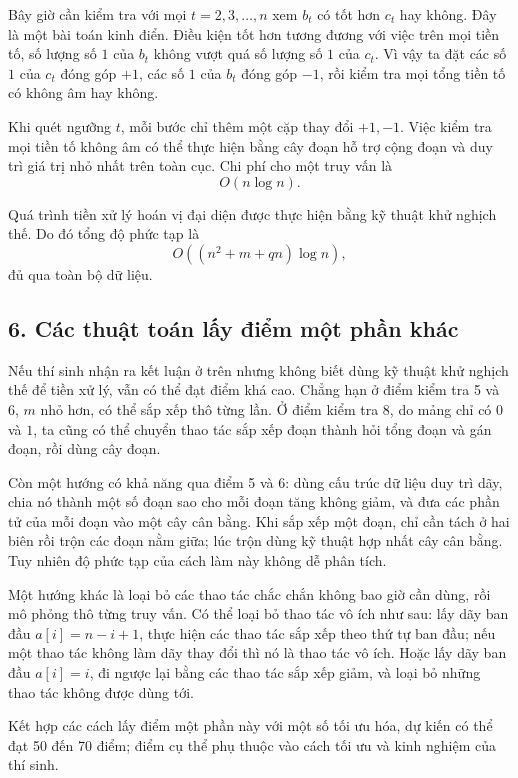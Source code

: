 \documentclass[11pt]{article}
\begin{document}
Bây giờ cần kiểm tra với mọi \(t=2,3,\ldots,n\) xem \(b_t\) có tốt hơn
\(c_t\) hay không. Đây là một bài toán kinh điển. Điều kiện tốt hơn tương
đương với việc trên mọi tiền tố, số lượng số \(1\) của \(b_t\) không vượt quá
số lượng số \(1\) của \(c_t\). Vì vậy ta đặt các số \(1\) của \(c_t\) đóng
góp \(+1\), các số \(1\) của \(b_t\) đóng góp \(-1\), rồi kiểm tra mọi tổng
tiền tố có không âm hay không.

Khi quét ngưỡng \(t\), mỗi bước chỉ thêm một cặp thay đổi \(+1,-1\). Việc kiểm
tra mọi tiền tố không âm có thể thực hiện bằng cây đoạn hỗ trợ cộng đoạn và
duy trì giá trị nhỏ nhất trên toàn cục. Chi phí cho một truy vấn là
\[
  O(n\log n).
\]

Quá trình tiền xử lý hoán vị đại diện được thực hiện bằng kỹ thuật khử nghịch
thế. Do đó tổng độ phức tạp là
\[
  O((n^2+m+qn)\log n),
\]
đủ qua toàn bộ dữ liệu.

\subsection*{6. Các thuật toán lấy điểm một phần khác}

Nếu thí sinh nhận ra kết luận ở trên nhưng không biết dùng kỹ thuật khử
nghịch thế để tiền xử lý, vẫn có thể đạt điểm khá cao. Chẳng hạn ở điểm kiểm
tra 5 và 6, \(m\) nhỏ hơn, có thể sắp xếp thô từng lần. Ở điểm kiểm tra 8,
do mảng chỉ có \(0\) và \(1\), ta cũng có thể chuyển thao tác sắp xếp đoạn
thành hỏi tổng đoạn và gán đoạn, rồi dùng cây đoạn.

Còn một hướng có khả năng qua điểm 5 và 6: dùng cấu trúc dữ liệu duy trì dãy,
chia nó thành một số đoạn sao cho mỗi đoạn tăng không giảm, và đưa các phần
tử của mỗi đoạn vào một cây cân bằng. Khi sắp xếp một đoạn, chỉ cần tách ở
hai biên rồi trộn các đoạn nằm giữa; lúc trộn dùng kỹ thuật hợp nhất cây cân
bằng. Tuy nhiên độ phức tạp của cách làm này không dễ phân tích.

Một hướng khác là loại bỏ các thao tác chắc chắn không bao giờ cần dùng, rồi
mô phỏng thô từng truy vấn. Có thể loại bỏ thao tác vô ích như sau: lấy dãy
ban đầu \(a[i]=n-i+1\), thực hiện các thao tác sắp xếp theo thứ tự ban đầu;
nếu một thao tác không làm dãy thay đổi thì nó là thao tác vô ích. Hoặc lấy
dãy ban đầu \(a[i]=i\), đi ngược lại bằng các thao tác sắp xếp giảm, và loại
bỏ những thao tác không được dùng tới.

Kết hợp các cách lấy điểm một phần này với một số tối ưu hóa, dự kiến có thể
đạt 50 đến 70 điểm; điểm cụ thể phụ thuộc vào cách tối ưu và kinh nghiệm của
thí sinh.
\end{document}
